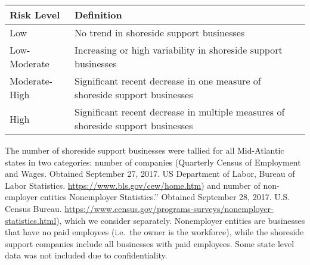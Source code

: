 \documentclass[11pt,]{article}
\begin{document}
\begin{longtable}[]{@{}ll@{}}
\toprule
\begin{minipage}[b]{0.22\columnwidth}\raggedright\strut
Risk Level\strut
\end{minipage} & \begin{minipage}[b]{0.72\columnwidth}\raggedright\strut
Definition\strut
\end{minipage}\tabularnewline
\midrule
\endhead
\begin{minipage}[t]{0.22\columnwidth}\raggedright\strut
Low\strut
\end{minipage} & \begin{minipage}[t]{0.72\columnwidth}\raggedright\strut
No trend in shoreside support businesses\strut
\end{minipage}\tabularnewline
\begin{minipage}[t]{0.22\columnwidth}\raggedright\strut
Low-Moderate\strut
\end{minipage} & \begin{minipage}[t]{0.72\columnwidth}\raggedright\strut
Increasing or high variability in shoreside support businesses\strut
\end{minipage}\tabularnewline
\begin{minipage}[t]{0.22\columnwidth}\raggedright\strut
Moderate-High\strut
\end{minipage} & \begin{minipage}[t]{0.72\columnwidth}\raggedright\strut
Significant recent decrease in one measure of shoreside support
businesses\strut
\end{minipage}\tabularnewline
\begin{minipage}[t]{0.22\columnwidth}\raggedright\strut
High\strut
\end{minipage} & \begin{minipage}[t]{0.72\columnwidth}\raggedright\strut
Significant recent decrease in multiple measures of shoreside support
businesses\strut
\end{minipage}\tabularnewline
\bottomrule
\end{longtable}

The number of shoreside support businesses were tallied for all
Mid-Atlantic states in two categories: number of companies (Quarterly
Census of Employment and Wages. Obtained September 27, 2017. US
Department of Labor, Bureau of Labor Statistics.
\url{https://www.bls.gov/cew/home.htm}) and number of non-employer
entities Nonemployer Statistics.'' Obtained September 28, 2017. U.S.
Census Bureau.
\url{https://www.census.gov/programs-surveys/nonemployer-statistics.html}),
which we consider separately. Nonemployer entities are businesses that
have no paid employees (i.e.~the owner is the workforce), while the
shoreside support companies include all businesses with paid employees.
Some state level data was not included due to confidentiality.
\end{document}
